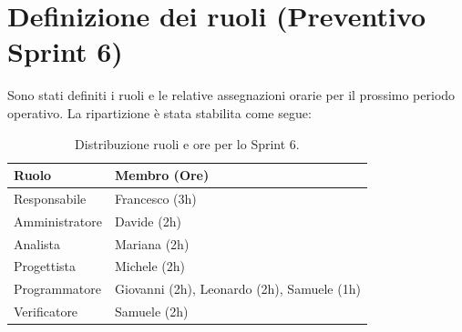 \documentclass[a4paper, 11pt, oneside]{scrartcl}
\begin{document}
\section{Definizione dei ruoli (Preventivo Sprint 6)}
Sono stati definiti i ruoli e le relative assegnazioni orarie per il prossimo periodo operativo.
La ripartizione è stata stabilita come segue:

\begin{table}[h!]
\centering
\begin{tabular}{@{}l l@{}}
\toprule
\textbf{Ruolo} & \textbf{Membro (Ore)} \\
\midrule
Responsabile   & Francesco (3h) \\
Amministratore & Davide (2h) \\
Analista       & Mariana (2h) \\
Progettista    & Michele (2h) \\
Programmatore  & Giovanni (2h), Leonardo (2h), Samuele (1h) \\
Verificatore   & Samuele (2h) \\
\bottomrule
\end{tabular}
\caption{Distribuzione ruoli e ore per lo Sprint 6.}
\end{table}
\end{document}
